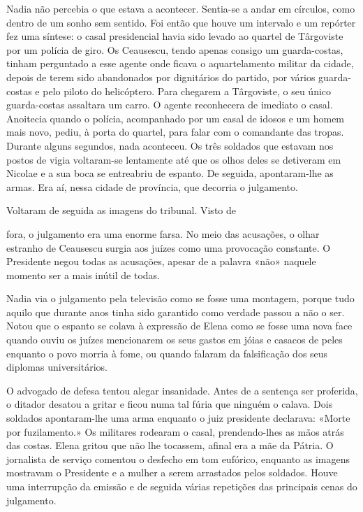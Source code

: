 Nadia não percebia o que estava a acontecer. Sentia-se
a andar em círculos, como dentro de um sonho sem sentido. Foi então que houve um intervalo e um repórter fez uma síntese: o
casal presidencial havia sido levado ao quartel de Târgoviste por um
polícia de giro. Os Ceausescu, tendo apenas consigo um guarda-costas,
tinham perguntado a esse agente onde ficava o aquartelamento militar da
cidade, depois de terem sido abandonados por dignitários do partido, por
vários guarda-costas e pelo piloto do helicóptero. Para chegarem a
Târgoviste, o seu único guarda-costas assaltara um carro. O agente
reconhecera de imediato o casal. Anoitecia quando o polícia,
acompanhado por um casal de idosos e um homem mais novo, pediu, à porta
do quartel, para falar com o comandante das tropas. Durante alguns
segundos, nada aconteceu. Os três soldados que estavam nos postos de
vigia voltaram-se lentamente até que os olhos deles se detiveram em
Nicolae e a sua boca se entreabriu de espanto. De seguida, apontaram-lhe
as armas. Era aí, nessa cidade de província, que decorria o julgamento.

Voltaram de seguida as imagens do tribunal. Visto de

fora, o julgamento era uma enorme farsa. No meio das acusações, o olhar
estranho de Ceausescu surgia aos juízes como uma provocação constante. O
Presidente negou todas as acusações, apesar de a palavra «não» naquele
momento ser a mais inútil de todas.

Nadia via o julgamento pela televisão como se fosse uma montagem, porque
tudo aquilo que durante anos tinha sido garantido como verdade passou a
não o ser. Notou que o espanto se colava à expressão de Elena como se
fosse uma nova face quando ouviu os juízes mencionarem os seus gastos
em jóias e casacos de peles enquanto o
povo morria à fome, ou quando falaram da falsificação dos seus diplomas
universitários.

O advogado de defesa tentou alegar insanidade. Antes de a sentença ser
proferida, o ditador desatou a gritar e ficou numa tal fúria que ninguém
o calava. Dois soldados apontaram-lhe uma arma enquanto o juiz
presidente declarava: «Morte por fuzilamento.» Os militares rodearam o
casal, prendendo-lhes as mãos atrás das costas. Elena gritou que não lhe
tocassem, afinal era a mãe da Pátria. O jornalista de serviço comentou o
desfecho em tom eufórico, enquanto as imagens mostravam o Presidente e
a mulher a serem arrastados pelos soldados. Houve uma interrupção da
emissão e de seguida várias repetições das principais cenas do
julgamento.

